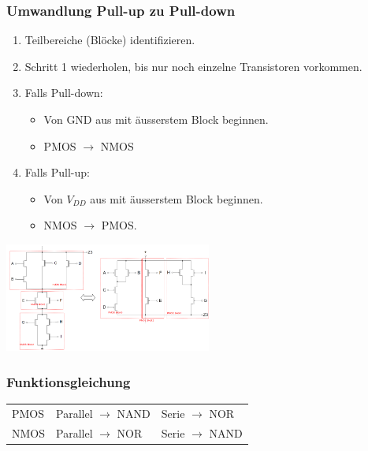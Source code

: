 \subsubsection{Umwandlung Pull-up zu Pull-down}
\begin{enumerate}
    \item Teilbereiche (Blöcke) identifizieren.
    \item Schritt 1 wiederholen, bis nur noch einzelne Transistoren vorkommen. 
    \item Falls Pull-down:
    \begin{itemize}
        \item Von GND aus mit äusserstem Block beginnen.
        \item PMOS $\rightarrow$ NMOS
    \end{itemize}
    \item Falls Pull-up:
    \begin{itemize}
        \item Von $V_{DD}$ aus mit äusserstem Block beginnen.
        \item NMOS $\rightarrow$ PMOS.
    \end{itemize}
\end{enumerate}
\includegraphics[width = 68mm]{images/pnmosconv.png}
\subsubsection{Funktionsgleichung}
\begin{flushleft}
    \begin{tabular}{l l l}
        PMOS & Parallel $\rightarrow$ NAND & Serie $\rightarrow$ NOR\\
        NMOS & Parallel $\rightarrow$ NOR & Serie $\rightarrow$ NAND\\
    \end{tabular}
\end{flushleft}
